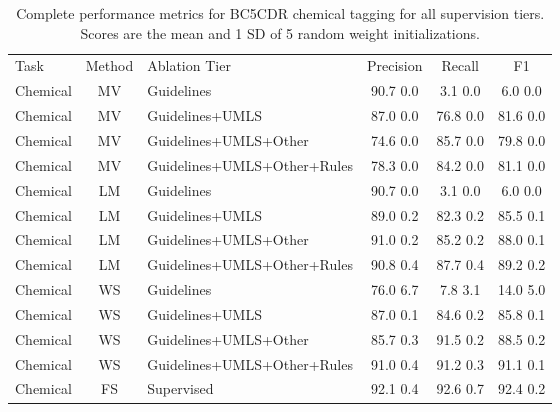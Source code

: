\documentclass{article}
\begin{document}
\begin{table}[H]
\centering
\begin{tabular}{lclccc} \toprule
Task & Method & Ablation Tier & Precision & Recall & F1 \\
\cmidrule(lr){1-6}
Chemical   &   MV   &   Guidelines   &   90.7 0.0   &   3.1 0.0   &   6.0 0.0  \\
Chemical   &   MV   &   Guidelines+UMLS   &   87.0 0.0   &   76.8 0.0   &   81.6 0.0  \\
Chemical   &   MV   &   Guidelines+UMLS+Other   &   74.6 0.0   &   85.7 0.0   &   79.8 0.0  \\
Chemical   &   MV   &   Guidelines+UMLS+Other+Rules   &   78.3 0.0   &   84.2 0.0   &   81.1 0.0  \\
\cmidrule(lr){1-6}
Chemical   &   LM   &   Guidelines   &   90.7 0.0   &   3.1 0.0   &   6.0 0.0  \\
Chemical   &   LM   &   Guidelines+UMLS   &   89.0 0.2   &   82.3 0.2   &   85.5 0.1  \\
Chemical   &   LM   &   Guidelines+UMLS+Other   &   91.0 0.2   &   85.2 0.2   &   88.0 0.1  \\
Chemical   &   LM   &   Guidelines+UMLS+Other+Rules   &   90.8 0.4   &   87.7 0.4   &   89.2 0.2  \\
\cmidrule(lr){1-6}
Chemical   &   WS  &   Guidelines   &   76.0 6.7   &   7.8 3.1   &   14.0 5.0  \\
Chemical   &   WS   &   Guidelines+UMLS   &   87.0 0.1   &   84.6 0.2   &   85.8 0.1  \\
Chemical   &   WS   &   Guidelines+UMLS+Other   &   85.7 0.3   &   91.5 0.2   &   88.5 0.2  \\
Chemical   &   WS   &   Guidelines+UMLS+Other+Rules   &   91.0 0.4   &   91.2 0.3   &   91.1 0.1  \\
\cmidrule(lr){1-6}
Chemical   &   FS   &   Supervised   &   92.1 0.4   &   92.6 0.7   &   92.4 0.2  \\
\bottomrule  
\end{tabular}
\caption{ \label{tbl:chemicals} Complete performance metrics for BC5CDR chemical tagging for all supervision tiers.
Scores are the mean and 1 SD of 5 random weight initializations.
}
\end{table}
\end{document}

